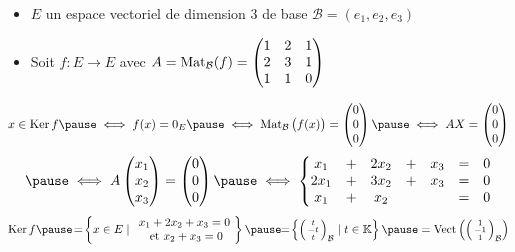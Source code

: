 \begin{frame}
\begin{exemple}
\begin{itemize}
  \item $E$ un espace vectoriel de dimension $3$ de base $\mathcal{B}=(e_1,e_2,e_3)$
  \pause
  \item Soit $f : E \to E$ avec $A = \mathop{\text{Mat}}\nolimits_{\mathcal{B}} (f) =
\begin{pmatrix}
1&2&1\cr
2&3&1\cr
1&1&0\cr
\end{pmatrix}$
\end{itemize}
\pause{}
\vspace*{-2ex}
\small
\pause
$$
x  \in \Ker f  \pause\iff 
f(x)= 0_E \pause\iff  \Mat_{\mathcal{B}} \big(f (x) \big) =
\begin{pmatrix}
0\cr
0\cr
0\end{pmatrix} 
\pause\iff 
A X =
\begin{pmatrix}
0\cr
0\cr
0\end{pmatrix}
$$
$$
\pause\iff
A
\begin{pmatrix}
x_1\cr
x_2\cr
x_3\end{pmatrix} =
 \begin{pmatrix}
0\cr
0\cr
0\end{pmatrix}
\pause\iff  \left \{
\begin{matrix}
x_1& +&2x_2&+&x_3&=&0\cr
2x_1& +&3x_2&+&x_3&=&0\cr
x_1&+&x_2&&&=&0\end{matrix}\right .
$$
\pause
$$\Ker f\pause\!=\!\left\{x \in E \mid 
\begin{array}{c}
x_1 + 2x_2+x_3 = 0 \\
\text{ et } x_2+x_3=0  
\end{array}
\!\right\}
\pause\!\!=\!\left\{ \left(\begin{smallmatrix}t\\-t\\t\end{smallmatrix}\right)_{\mathcal{B}} \mid t \in \Kk \right\} 
\pause= \Vect\left( \left(\begin{smallmatrix}1\\-1\\1\end{smallmatrix}\right)_{\mathcal{B}}\right)$$

\end{exemple}
\end{frame}

